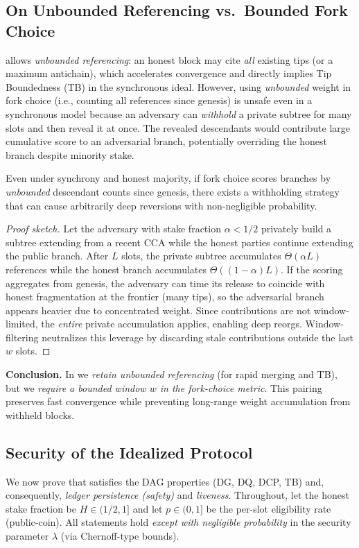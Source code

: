 \subsection{On Unbounded Referencing vs.\ Bounded Fork Choice}
\label{subsec:ideal-window-justification}
\ProjIdeal allows \emph{unbounded referencing}: an honest block may cite \emph{all} existing tips (or a maximum antichain), which accelerates convergence and directly implies Tip Boundedness (TB) in the synchronous ideal.
However, using \emph{unbounded} weight in fork choice (i.e., counting all references since genesis) is unsafe even in a synchronous model because an adversary can \emph{withhold} a private subtree for many slots and then reveal it at once. The revealed descendants would contribute large cumulative score to an adversarial branch, potentially overriding the honest branch despite minority stake.

\begin{lemma}
Even under synchrony and honest majority, if fork choice scores branches by \emph{unbounded} descendant counts since genesis, there exists a withholding strategy that can cause arbitrarily deep reversions with non-negligible probability.
\end{lemma}

\begin{proof}[Proof sketch]
Let the adversary with stake fraction $\alpha<1/2$ privately build a subtree extending from a recent CCA while the honest parties continue extending the public branch. After $L$ slots, the private subtree accumulates $\Theta(\alpha L)$ references while the honest branch accumulates $\Theta((1-\alpha)L)$. If the scoring aggregates from genesis, the adversary can time its release to coincide with honest fragmentation at the frontier (many tips), so the adversarial branch appears heavier due to concentrated weight. Since contributions are not window-limited, the \emph{entire} private accumulation applies, enabling deep reorgs. Window-filtering neutralizes this leverage by discarding stale contributions outside the last $w$ slots.
\end{proof}

\noindent\textbf{Conclusion.} In \ProjIdeal we \emph{retain unbounded referencing} (for rapid merging and TB), but we \emph{require a bounded window $w$ in the fork-choice metric}. This pairing preserves fast convergence while preventing long-range weight accumulation from withheld blocks.

\subsection{Security of the Idealized Protocol}
\label{subsec:ideal-security}
We now prove that \ProjIdeal satisfies the DAG properties (DG, DQ, DCP, TB) and, consequently, \emph{ledger persistence (safety)} and \emph{liveness}. Throughout, let the honest stake fraction be $H\in(1/2,1]$ and let $p\in(0,1]$ be the per-slot eligibility rate (public-coin). All statements hold \emph{except with negligible probability} in the security parameter $\lambda$ (via Chernoff-type bounds).


